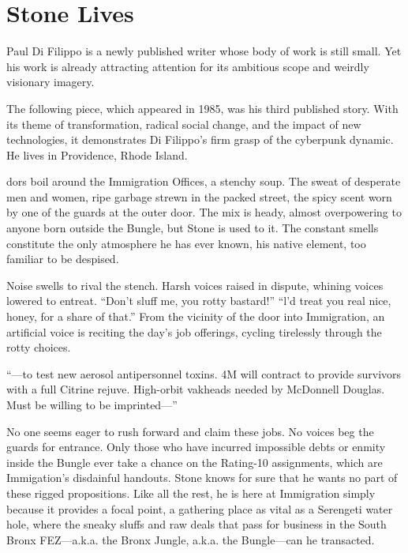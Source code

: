 \chapter{Stone Lives}

Paul Di Filippo is a newly published writer whose body of work is still small. Yet his work is already attracting attention for its ambitious scope and weirdly visionary imagery.

The following piece, which appeared in 1985, was his third published story. With its theme of transformation, radical social change, and the impact of new technologies, it demonstrates Di Filippo's firm grasp of the cyberpunk dynamic. He lives in Providence, Rhode Island.

\hrulefill

dors boil around the Immigration Offices, a stenchy soup. The sweat of desperate men and women, ripe garbage strewn in the packed street, the spicy scent worn by one of the guards at the outer door. The mix is heady, almost overpowering to anyone born outside the Bungle, but Stone is used to it. The constant smells constitute the only atmosphere he has ever known, his native element, too familiar to be despised.

Noise swells to rival the stench. Harsh voices raised in dispute, whining voices lowered to entreat. ``Don't sluff me, you rotty bastard!'' ``l'd treat you real nice, honey, for a share of that.'' From the vicinity of the door into Immigration, an artificial voice is reciting the day's job offerings, cycling tirelessly through the rotty choices.

``---to test new aerosol antipersonnel toxins. 4M will contract to provide survivors with a full Citrine rejuve. High-orbit vakheads needed by McDonnell Douglas. Must be willing to be imprinted---''

No one seems eager to rush forward and claim these jobs. No voices beg the guards for entrance. Only those who have incurred impossible debts or enmity inside the Bungle ever take a chance on the Rating-10 assignments, which are Immigation's disdainful handouts. Stone knows for sure that he wants no part of these rigged propositions. Like all the rest, he is here at Immigration simply because it provides a focal point, a gathering place as vital as a Serengeti water hole, where the sneaky sluffs and raw deals that pass for business in the South Bronx FEZ---a.k.a. the Bronx Jungle, a.k.a. the Bungle---can he transacted.

